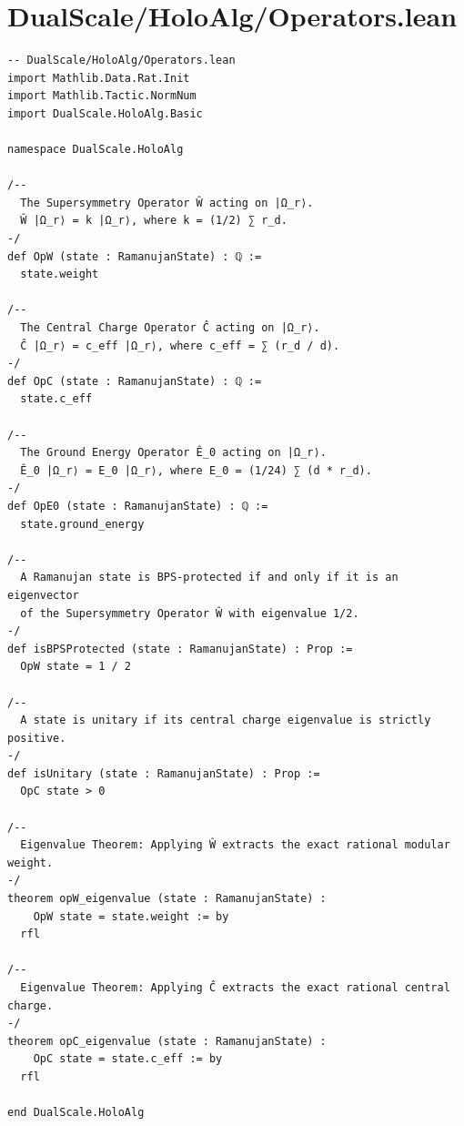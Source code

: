 \documentclass[11pt,twoside,openright]{book}
\begin{document}
\section{DualScale/HoloAlg/Operators.lean}
\begin{verbatim}
-- DualScale/HoloAlg/Operators.lean
import Mathlib.Data.Rat.Init
import Mathlib.Tactic.NormNum
import DualScale.HoloAlg.Basic

namespace DualScale.HoloAlg

/-- 
  The Supersymmetry Operator Ŵ acting on |Ω_r⟩.
  Ŵ |Ω_r⟩ = k |Ω_r⟩, where k = (1/2) ∑ r_d.
-/
def OpW (state : RamanujanState) : ℚ :=
  state.weight

/-- 
  The Central Charge Operator Ĉ acting on |Ω_r⟩.
  Ĉ |Ω_r⟩ = c_eff |Ω_r⟩, where c_eff = ∑ (r_d / d).
-/
def OpC (state : RamanujanState) : ℚ :=
  state.c_eff

/-- 
  The Ground Energy Operator Ê_0 acting on |Ω_r⟩.
  Ê_0 |Ω_r⟩ = E_0 |Ω_r⟩, where E_0 = (1/24) ∑ (d * r_d).
-/
def OpE0 (state : RamanujanState) : ℚ :=
  state.ground_energy

/-- 
  A Ramanujan state is BPS-protected if and only if it is an eigenvector
  of the Supersymmetry Operator Ŵ with eigenvalue 1/2.
-/
def isBPSProtected (state : RamanujanState) : Prop :=
  OpW state = 1 / 2

/-- 
  A state is unitary if its central charge eigenvalue is strictly positive.
-/
def isUnitary (state : RamanujanState) : Prop :=
  OpC state > 0

/-- 
  Eigenvalue Theorem: Applying Ŵ extracts the exact rational modular weight.
-/
theorem opW_eigenvalue (state : RamanujanState) :
    OpW state = state.weight := by
  rfl

/-- 
  Eigenvalue Theorem: Applying Ĉ extracts the exact rational central charge.
-/
theorem opC_eigenvalue (state : RamanujanState) :
    OpC state = state.c_eff := by
  rfl

end DualScale.HoloAlg

\end{verbatim}
\end{document}
